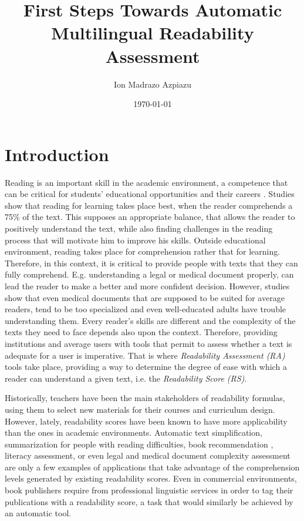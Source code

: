 \documentclass[12pt]{article}
\title{First Steps Towards Automatic Multilingual Readability Assessment}
\author{Ion Madrazo Azpiazu}
\date{\today}
\begin{document}
\maketitle
\section{Introduction}

Reading is an important skill in the academic environment, a competence that can be critical for students' educational opportunities and their careers \cite{robinson2000issues}. Studies \cite{lennon2004lexile} show that reading for learning takes place best, when the reader comprehends a 75\% of the text. This supposes an appropriate balance, that allows the reader to positively understand the text, while also finding challenges in the reading process that will motivate  him to improve his skills. Outside educational environment, reading takes place for comprehension rather that for learning. Therefore, in this context, it is critical to provide people with texts that they can fully comprehend. E.g. understanding a legal or medical document properly, can lead the reader to make a better and more confident decision. However, studies\cite{medicalReadability1,medicalReadability2,medicalReadability3}  show that even medical documents that are supposed to be suited for average readers, tend to be too specialized and even well-educated adults have trouble understanding them.
Every reader's skills are different and the complexity of the texts they need to face depends also upon the context. Therefore, providing institutions and average users with tools that permit to assess whether a text is adequate for a user is imperative. That is where \textit{Readability Assessment (RA)} tools take place, providing a way to determine the degree of ease with which a reader can understand a given text, i.e. the \textit{Readability Score (RS)}.



 Historically, teachers have been the main stakeholders of readability formulas, using them to select new materials for their courses and curriculum design. However, lately, readability scores have been known to have more applicability than the ones in academic environments. Automatic text simplification\cite{textsimplification1,textsimplification2}, summarization for people with reading difficulties\cite{textsimplificationWithDisabilities1}, book recommendation \cite{pera2014automating}, literacy assessment\cite{literacy1}, or even legal\cite{legalreadability} and medical document complexity assessment\cite{medicalReadability1,medicalReadability2,medicalReadability3}  are only a few examples of applications that take advantage of the comprehension levels generated by existing readability scores. Even in commercial environments, book publishers require from professional linguistic services in order to tag their publications with a readability score, a task that would similarly be achieved by an automatic tool.
\end{document}
